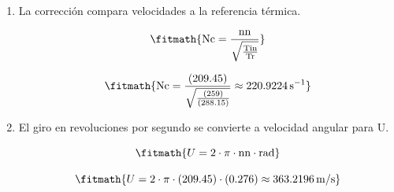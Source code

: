 \begin{enumerate}

\item La corrección compara velocidades a la referencia térmica.

\[\fitmath{\mathrm{Nc}=\frac{\mathrm{nn}}{\sqrt{\frac{\mathrm{Tin}}{\mathrm{Tr}}}}}\]

\[\fitmath{\mathrm{Nc}=\frac{(209.45)}{\sqrt{\frac{(259)}{(288.15)}}}\approx 220.9224\,\mathrm{s^{-1}}}\]

\item El giro en revoluciones por segundo se convierte a velocidad angular para U.

\[\fitmath{U=2\cdot \pi\cdot \mathrm{nn}\cdot \mathrm{rad}}\]

\[\fitmath{U=2\cdot \pi\cdot (209.45)\cdot (0.276)\approx 363.2196\,\mathrm{m/s}}\]

\end{enumerate}
